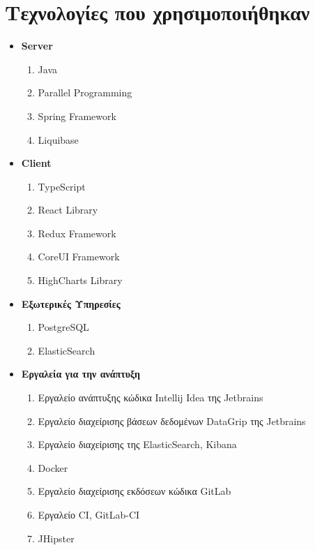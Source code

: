 \section{Τεχνολογίες που χρησιμοποιήθηκαν}
\begin{itemize}
    \item \textbf{Server}
    \begin{enumerate}
        \item Java
        \item Parallel Programming
        \item Spring Framework
        \item Liquibase
    \end{enumerate}
    \item \textbf{Client}
    \begin{enumerate}
        \item TypeScript %
        \item React Library
        \item Redux Framework
        \item CoreUI Framework
        \item HighCharts Library
    \end{enumerate}
    \item \textbf{Εξωτερικές Υπηρεσίες}
    \begin{enumerate}
        \item PostgreSQL
        \item ElasticSearch
    \end{enumerate}
    \item \textbf{Εργαλεία για την ανάπτυξη}
    \begin{enumerate}
        \item Εργαλείο ανάπτυξης κώδικα Intellij Idea της Jetbrains
        \item Εργαλείο διαχείρισης βάσεων δεδομένων DataGrip της Jetbrains
        \item Εργαλείο διαχείρισης της ElasticSearch, Kibana
        \item Docker
        \item Εργαλείο διαχείρισης εκδόσεων κώδικα GitLab
        \item Εργαλείο CI, GitLab-CI
        \item JHipster
    \end{enumerate}
\end{itemize}